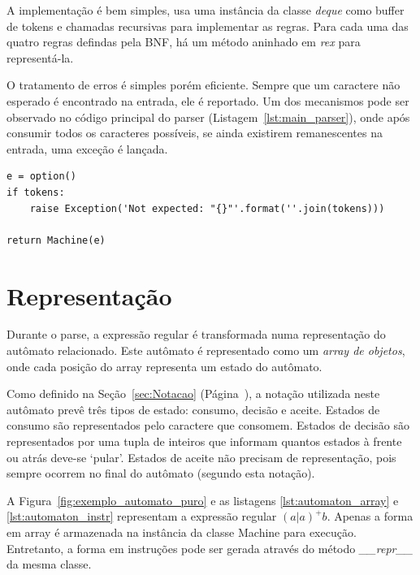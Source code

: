 \documentclass[a4paper,12pt,oneside,onecolumn]{uerj}
\begin{document}
A implementação é bem simples, usa uma instância da classe \emph{deque} como buffer de tokens e chamadas recursivas para implementar as regras. Para cada uma das quatro regras defindas pela BNF, há um método aninhado em \emph{rex} para representá-la.

O tratamento de erros é simples porém eficiente. Sempre que um caractere não esperado é encontrado na entrada, ele é reportado. Um dos mecanismos pode ser observado no código principal do parser (Listagem~\ref{lst:main_parser}), onde após consumir todos os caracteres possíveis, se ainda existirem remanescentes na entrada, uma exceção é lançada.

\vspace{0.5cm}
\noindent\begin{minipage}{\textwidth}
\begin{lstlisting}[caption={Exemplo de tratamento de erros no parser},label=lst:main_parser]
e = option()
if tokens: 
    raise Exception('Not expected: "{}"'.format(''.join(tokens)))

return Machine(e)
\end{lstlisting}
\end{minipage}

\section{Representação}

Durante o parse, a expressão regular é transformada numa representação do autômato relacionado. Este autômato é representado como um \emph{array de objetos}, onde cada posição do array representa um estado do autômato.

Como definido na Seção~\ref{sec:Notacao} (Página~\pageref{sec:Notacao}), a notação utilizada neste autômato prevê três tipos de estado: consumo, decisão e aceite. Estados de consumo são representados pelo caractere que consomem. Estados de decisão são representados por uma tupla de inteiros que informam quantos estados à frente ou atrás deve-se `pular'. Estados de aceite não precisam de representação, pois sempre ocorrem no final do autômato (segundo esta notação).

A Figura~\ref{fig:exemplo_automato_puro} e as listagens \ref{lst:automaton_array} e \ref{lst:automaton_instr} representam a expressão regular $(a|a)^+b$. Apenas a forma em array é armazenada na instância da classe Machine para execução. Entretanto, a forma em instruções pode ser gerada através do método \emph{\_\_repr\_\_} da mesma classe.
\end{document}
